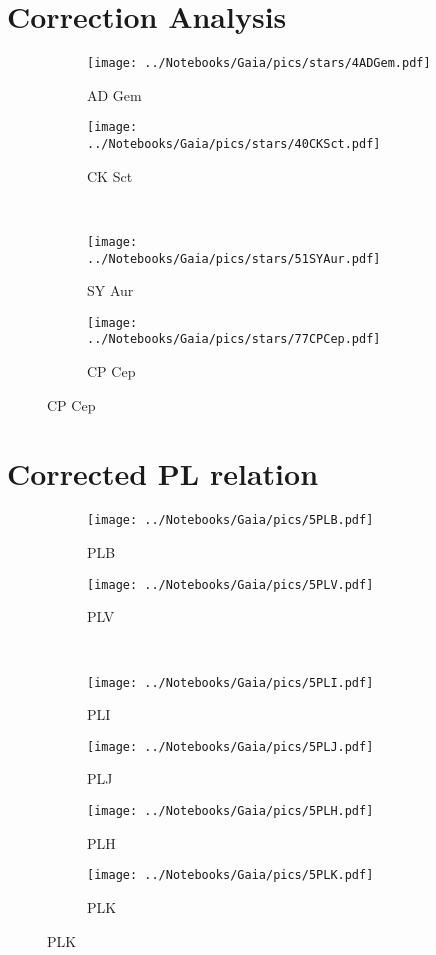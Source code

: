 \documentclass[12pt,a4paper]{article}
\begin{document}
\section{Correction Analysis}	
	\begin{figure}[h]
		\centering
		\begin{subfigure}[b]{0.45\textwidth}
			\centering
			\texttt{[image: ../Notebooks/Gaia/pics/stars/4ADGem.pdf]}
			\caption{AD Gem}
		\end{subfigure}
		\quad
		\begin{subfigure}[b]{0.45\textwidth}
			\centering
			\texttt{[image: ../Notebooks/Gaia/pics/stars/40CKSct.pdf]}
			\caption{CK Sct}
		\end{subfigure}
		\\
		\begin{subfigure}[b]{0.45\textwidth}
			\centering
			\texttt{[image: ../Notebooks/Gaia/pics/stars/51SYAur.pdf]}
			\caption{SY Aur}
		\end{subfigure}
		\quad
		\begin{subfigure}[b]{0.45\textwidth}
		\centering
		\texttt{[image: ../Notebooks/Gaia/pics/stars/77CPCep.pdf]}
		\caption{CP Cep}
		\end{subfigure}
	\end{figure}

\section{Corrected PL relation}
	\begin{figure}[h]
	\centering
	\begin{subfigure}[b]{0.48\textwidth}
		\centering
		\texttt{[image: ../Notebooks/Gaia/pics/5PLB.pdf]}
		\caption{PLB}
	\end{subfigure}
	\quad
	\begin{subfigure}[b]{0.48\textwidth}
		\centering
		\texttt{[image: ../Notebooks/Gaia/pics/5PLV.pdf]}
		\caption{PLV}
	\end{subfigure}
	\\
	\begin{subfigure}[b]{0.48\textwidth}
		\centering
		\texttt{[image: ../Notebooks/Gaia/pics/5PLI.pdf]}
		\caption{PLI}
	\end{subfigure}
	\quad
	\begin{subfigure}[b]{0.48\textwidth}
		\centering
		\texttt{[image: ../Notebooks/Gaia/pics/5PLJ.pdf]}
		\caption{PLJ}
	\end{subfigure}
	\begin{subfigure}[b]{0.48\textwidth}
	\centering
	\texttt{[image: ../Notebooks/Gaia/pics/5PLH.pdf]}
	\caption{PLH}
	\end{subfigure}
	\begin{subfigure}[b]{0.48\textwidth}
	\centering
	\texttt{[image: ../Notebooks/Gaia/pics/5PLK.pdf]}
	\caption{PLK}
\end{subfigure}
\end{figure}
\end{document}
